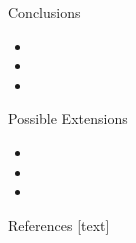 \documentclass[final]{beamer}\usepackage[]{graphicx}\usepackage[]{color}
\begin{document}
\begin{frame}[fragile]
\begin{columns}[t]
\begin{column}{0.23\linewidth}
\begin{minipage}[t][.955\textheight]{\linewidth}
\begin{block}{Conclusions}
\begin{itemize}
\item
\item
\item
\end{itemize}
\vspace{0ex}
\vfill
\end{block}
\vfill

\begin{block}{Possible Extensions}
\begin{itemize}
\item  
\item  
\item  
\end{itemize}
\vspace{0ex}
\vfill
\end{block}
\vfill

\begin{block}{References}
\footnotesize
{}[text]
\vspace{-1ex}



\normalsize
\vfill
\end{block} 
\vfill

\end{minipage}
\end{column}%




\end{columns}
\end{frame}
\end{document}
